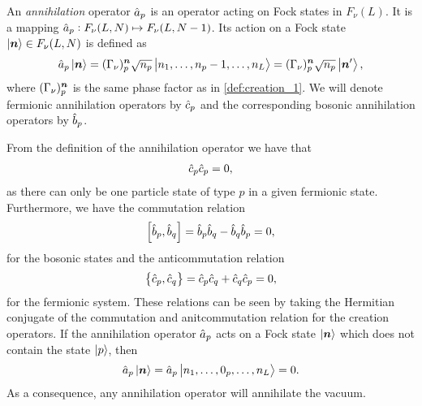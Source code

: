             \begin{definition}
                \label{def:annihilation_1}
                An \emph{annihilation} operator $\hat{a}_{p}$ is an operator acting
                on Fock states in $F_{\nu}(L)$.
                It is a mapping $\hat{a}_{p}: F_{\nu}(L, N) \mapsto F_{\nu}(L, N -
                1)$.
                Its action on a Fock state $\ket{\boldsymbol{n}} \in F_{\nu}(L, N)$ is
                defined as
                \begin{align}
                    \hat{a}_{p}\ket{\boldsymbol{n}}
                    = (\Gamma_{\nu})^{\boldsymbol{n}}_{p}
                    \sqrt{n_p}
                    \ket{n_1, \dots, n_p - 1, \dots, n_L}
                    = (\Gamma_{\nu})^{\boldsymbol{n}}_{p}
                    \sqrt{n_p}
                    \ket{\boldsymbol{n}'},
                \end{align}
                where $(\Gamma_{\nu})^{\boldsymbol{n}}_{p}$ is the same phase factor as
                in \autoref{def:creation_1}.
                We will denote fermionic annihilation operators by $\hat{c}_{p}$ and
                the corresponding bosonic annihilation operators by $\hat{b}_{p}$.
            \end{definition}
            From the definition of the annihilation operator we have that
            \begin{align}
                \hat{c}_{p}\hat{c}_{p} = 0,
            \end{align}
            as there can only be one particle state of type $p$ in a given
            fermionic state.
            Furthermore, we have the commutation relation
            \begin{align}
                \left[\hat{b}_{p}, \hat{b}_{q}\right] = \hat{b}_{p}\hat{b}_{q} - \hat{b}_{q}\hat{b}_{p} = 0,
            \end{align}
            for the bosonic states and the anticommutation relation
            \begin{align}
                \left\{\hat{c}_{p}, \hat{c}_{q}\right\} = \hat{c}_{p}\hat{c}_{q} + \hat{c}_{q}\hat{c}_{p} = 0,
            \end{align}
            for the fermionic system.
            These relations can be seen by taking the Hermitian conjugate of the
            commutation and anitcommutation relation for the creation operators.
            If the annihilation operator $\hat{a}_{p}$ acts on a Fock state
            $\ket{\boldsymbol{n}}$ which does not contain the state $\ket{p}$, then
            \begin{align}
                \hat{a}_{p}\ket{\boldsymbol{n}}
                = \hat{a}_{p}\ket{n_1, \dots, 0_p, \dots, n_L}
                = 0.
            \end{align}
            As a consequence, any annihilation operator will annihilate the
            vacuum.

